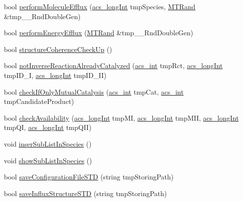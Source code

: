 \begin{DoxyCompactItemize}
\item 
bool \hyperlink{classenvironment_ad072a40a7d9521379c7ff50ed8110fbe}{perform\-Molecule\-Efflux} (\hyperlink{acs__headers_8h_a19319d75f02db4308bc5c0026d98cd85}{acs\-\_\-long\-Int} tmp\-Species, \hyperlink{class_m_t_rand}{M\-T\-Rand} \&tmp\-\_\-\-\_\-\-Rnd\-Double\-Gen)
\item 
bool \hyperlink{classenvironment_aff7607e0f3a74790109a7d87de3031bd}{perform\-Energy\-Efflux} (\hyperlink{class_m_t_rand}{M\-T\-Rand} \&tmp\-\_\-\-\_\-\-Rnd\-Double\-Gen)
\item 
bool \hyperlink{classenvironment_a6606b08f25751a8796c13810962b385e}{structure\-Coherence\-Check\-Up} ()
\item 
bool \hyperlink{classenvironment_a5160dec152ed0369fe8af9aff3253a9e}{not\-Inverse\-Reaction\-Already\-Catalyzed} (\hyperlink{acs__headers_8h_a8d277355641a098190360234e2ebde35}{acs\-\_\-int} tmp\-Rct, \hyperlink{acs__headers_8h_a19319d75f02db4308bc5c0026d98cd85}{acs\-\_\-long\-Int} tmp\-I\-D\-\_\-\-I, \hyperlink{acs__headers_8h_a19319d75f02db4308bc5c0026d98cd85}{acs\-\_\-long\-Int} tmp\-I\-D\-\_\-\-I\-I)
\item 
bool \hyperlink{classenvironment_abdafaeba15b5d32fd35569869c6244d5}{check\-If\-Only\-Mutual\-Catalysis} (\hyperlink{acs__headers_8h_a8d277355641a098190360234e2ebde35}{acs\-\_\-int} tmp\-Cat, \hyperlink{acs__headers_8h_a8d277355641a098190360234e2ebde35}{acs\-\_\-int} tmp\-Candidate\-Product)
\item 
bool \hyperlink{classenvironment_ad3ebcd7ab1c9ba1a0f65b264b97adf33}{check\-Availability} (\hyperlink{acs__headers_8h_a19319d75f02db4308bc5c0026d98cd85}{acs\-\_\-long\-Int} tmp\-M\-I, \hyperlink{acs__headers_8h_a19319d75f02db4308bc5c0026d98cd85}{acs\-\_\-long\-Int} tmp\-M\-I\-I, \hyperlink{acs__headers_8h_a19319d75f02db4308bc5c0026d98cd85}{acs\-\_\-long\-Int} tmp\-Q\-I, \hyperlink{acs__headers_8h_a19319d75f02db4308bc5c0026d98cd85}{acs\-\_\-long\-Int} tmp\-Q\-I\-I)
\item 
void \hyperlink{classenvironment_af293fafca4582120d88f888d70d8623a}{inser\-Sub\-List\-In\-Species} ()
\item 
void \hyperlink{classenvironment_a5cb194f927ddc7a804a942ca71f062af}{show\-Sub\-List\-In\-Species} ()
\item 
bool \hyperlink{classenvironment_a71f4c5ff1c11a9d61cbc818682a4a91e}{save\-Configuration\-File\-S\-T\-D} (string tmp\-Storing\-Path)
\item 
bool \hyperlink{classenvironment_a8f831e2db11fa5d840484345dac64fc7}{save\-Influx\-Structure\-S\-T\-D} (string tmp\-Storing\-Path)

\end{DoxyCompactItemize}
